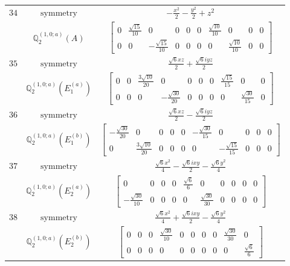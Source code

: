 \documentclass[fleqn,8pt,landscape]{jsarticle}
\begin{document}
\begin{longtable}{ccc}
$ 34 $ & $ \text{symmetry} $ & $ - \frac{x^{2}}{2} - \frac{y^{2}}{2} + z^{2} $ \\
$  $ & $ \mathbb{Q}_{2}^{(1,0;a)}(A) $ & $ \begin{bmatrix} 0 & \frac{\sqrt{15}}{10} & 0 & 0 & 0 & 0 & \frac{\sqrt{10}}{10} & 0 & 0 & 0 \\ 0 & 0 & - \frac{\sqrt{15}}{10} & 0 & 0 & 0 & 0 & \frac{\sqrt{10}}{10} & 0 & 0 \end{bmatrix} $ \\ \hline
$ 35 $ & $ \text{symmetry} $ & $ \frac{\sqrt{6} x z}{2} + \frac{\sqrt{6} i y z}{2} $ \\
$  $ & $ \mathbb{Q}_{2}^{(1,0;a)}(E_{1}^{(a)}) $ & $ \begin{bmatrix} 0 & 0 & \frac{3 \sqrt{10}}{20} & 0 & 0 & 0 & 0 & \frac{\sqrt{15}}{15} & 0 & 0 \\ 0 & 0 & 0 & - \frac{\sqrt{30}}{20} & 0 & 0 & 0 & 0 & \frac{\sqrt{30}}{15} & 0 \end{bmatrix} $ \\ \hline
$ 36 $ & $ \text{symmetry} $ & $ \frac{\sqrt{6} x z}{2} - \frac{\sqrt{6} i y z}{2} $ \\
$  $ & $ \mathbb{Q}_{2}^{(1,0;a)}(E_{1}^{(b)}) $ & $ \begin{bmatrix} - \frac{\sqrt{30}}{20} & 0 & 0 & 0 & 0 & - \frac{\sqrt{30}}{15} & 0 & 0 & 0 & 0 \\ 0 & \frac{3 \sqrt{10}}{20} & 0 & 0 & 0 & 0 & - \frac{\sqrt{15}}{15} & 0 & 0 & 0 \end{bmatrix} $ \\ \hline
$ 37 $ & $ \text{symmetry} $ & $ \frac{\sqrt{6} x^{2}}{4} - \frac{\sqrt{6} i x y}{2} - \frac{\sqrt{6} y^{2}}{4} $ \\
$  $ & $ \mathbb{Q}_{2}^{(1,0;a)}(E_{2}^{(a)}) $ & $ \begin{bmatrix} 0 & 0 & 0 & 0 & \frac{\sqrt{6}}{6} & 0 & 0 & 0 & 0 & 0 \\ - \frac{\sqrt{30}}{10} & 0 & 0 & 0 & 0 & \frac{\sqrt{30}}{30} & 0 & 0 & 0 & 0 \end{bmatrix} $ \\ \hline
$ 38 $ & $ \text{symmetry} $ & $ \frac{\sqrt{6} x^{2}}{4} + \frac{\sqrt{6} i x y}{2} - \frac{\sqrt{6} y^{2}}{4} $ \\
$  $ & $ \mathbb{Q}_{2}^{(1,0;a)}(E_{2}^{(b)}) $ & $ \begin{bmatrix} 0 & 0 & 0 & \frac{\sqrt{30}}{10} & 0 & 0 & 0 & 0 & \frac{\sqrt{30}}{30} & 0 \\ 0 & 0 & 0 & 0 & 0 & 0 & 0 & 0 & 0 & \frac{\sqrt{6}}{6} \end{bmatrix} $ \\ \hline

\end{longtable}
\end{document}
